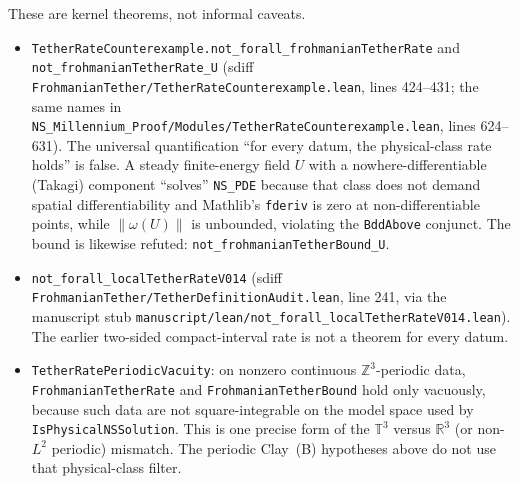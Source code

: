 \documentclass[11pt]{article}
\theoremstyle{plain}
\theoremstyle{definition}
\theoremstyle{remark}
\newcommand{\Tthree}{\mathbb{T}^{3}}
\newcommand{\R}{\mathbb{R}}
\begin{document}
These are kernel theorems, not informal caveats.
{\sloppy\begin{itemize}[leftmargin=1.4em]
\item \texttt{TetherRateCounterexample.\hspace{0pt}not\_\hspace{0pt}forall\_\hspace{0pt}frohmanianTetherRate} and \texttt{not\_\hspace{0pt}frohmanianTetherRate\_\hspace{0pt}U} (sdiff \texttt{FrohmanianTether/\hspace{0pt}TetherRateCounterexample.\hspace{0pt}lean}, lines 424--431; the same names in \texttt{NS\_\hspace{0pt}Millennium\_\hspace{0pt}Proof/\hspace{0pt}Modules/\hspace{0pt}TetherRateCounterexample.\hspace{0pt}lean}, lines 624--631). The universal quantification ``for every datum, the physical-class rate holds'' is false. A steady finite-energy field \(U\) with a nowhere-differentiable (Takagi) component ``solves'' \texttt{NS\_PDE} because that class does not demand spatial differentiability and Mathlib's \texttt{fderiv} is zero at non-differentiable points, while \(\|\omega(U)\|\) is unbounded, violating the \texttt{BddAbove} conjunct. The bound is likewise refuted: \texttt{not\_\hspace{0pt}frohmanianTetherBound\_\hspace{0pt}U}.
\item \texttt{not\_\hspace{0pt}forall\_\hspace{0pt}localTetherRateV014} (sdiff \texttt{FrohmanianTether/\hspace{0pt}TetherDefinitionAudit.\hspace{0pt}lean}, line 241, via the manuscript stub \texttt{manuscript/\hspace{0pt}lean/\hspace{0pt}not\_\hspace{0pt}forall\_\hspace{0pt}localTetherRateV014.\hspace{0pt}lean}). The earlier two-sided compact-interval rate is not a theorem for every datum.
\item \texttt{TetherRatePeriodicVacuity}: on nonzero continuous \(\mathbb{Z}^{3}\)-periodic data, \texttt{FrohmanianTetherRate} and \texttt{FrohmanianTetherBound} hold only vacuously, because such data are not square-integrable on the model space used by \texttt{IsPhysicalNSSolution}. This is one precise form of the \(\Tthree\) versus \(\R^{3}\) (or non-\(L^{2}\) periodic) mismatch. The periodic Clay~(B) hypotheses above do not use that physical-class filter.

\end{itemize}}
\end{document}
